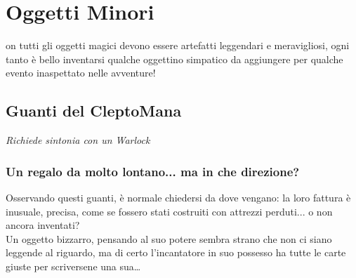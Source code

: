 




\section{Oggetti Minori}

on tutti gli oggetti magici devono essere artefatti leggendari e meravigliosi, ogni tanto è bello inventarsi qualche oggettino simpatico da aggiungere per qualche evento inaspettato nelle avventure!

\subsection{Guanti del CleptoMana}
\textit{Richiede sintonia con un Warlock} 

\subsubsection{Un regalo da molto lontano... ma in che direzione?}
Osservando questi guanti, è normale chiedersi da dove vengano: la loro fattura è inusuale, precisa, come se fossero stati costruiti con attrezzi perduti... o non ancora inventati? \\
Un oggetto bizzarro, pensando al suo potere sembra strano che non ci siano leggende al riguardo, ma di certo l'incantatore in suo possesso ha tutte le carte giuste per scriversene una sua…

